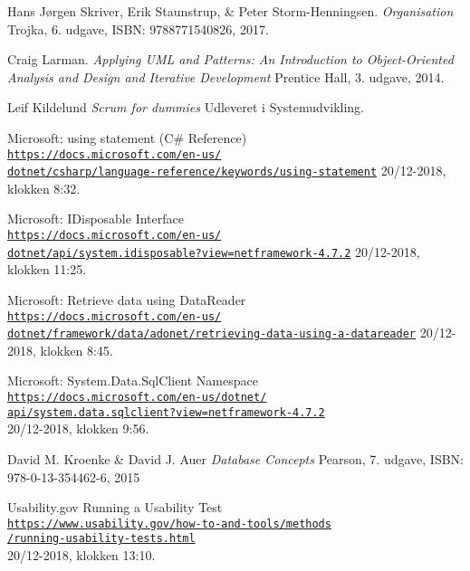 \begin{thebibliography}{9}

Hans Jørgen Skriver, Erik Staunstrup, \& Peter Storm-Henningsen.
\textit{Organisation}
Trojka, 6. udgave, ISBN: 9788771540826, 2017.

Craig Larman.
\textit{Applying UML and Patterns: An Introduction to Object-Oriented Analysis and Design and Iterative Development}
Prentice Hall, 3. udgave, 2014.

Leif Kildelund
\textit{Scrum for dummies}
Udleveret i Systemudvikling.

Microsoft: using statement (C\# Reference)
\\\href{https://docs.microsoft.com/en-us/dotnet/csharp/language-reference/keywords/using-statement}{\texttt{https://docs.microsoft.com/en-us/\\dotnet/csharp/language-reference/keywords/using-statement}}
20/12-2018, klokken 8:32.

Microsoft: IDisposable Interface
\\\href{https://docs.microsoft.com/en-us/dotnet/api/system.idisposable?view=netframework-4.7.2}{\texttt{https://docs.microsoft.com/en-us/\\dotnet/api/system.idisposable?view=netframework-4.7.2}}
20/12-2018, klokken 11:25.

Microsoft: Retrieve data using DataReader
\\\href{https://docs.microsoft.com/en-us/dotnet/framework/data/adonet/retrieving-data-using-a-datareader}{\texttt{https://docs.microsoft.com/en-us/\\dotnet/framework/data/adonet/retrieving-data-using-a-datareader}}
20/12-2018, klokken 8:45.

Microsoft: System.Data.SqlClient Namespace
\\\href{https://docs.microsoft.com/en-us/dotnet/api/system.data.sqlclient?view=netframework-4.7.2}{\texttt{https://docs.microsoft.com/en-us/dotnet/\\api/system.data.sqlclient?view=netframework-4.7.2}}
\\20/12-2018, klokken 9:56.

David M. Kroenke \& David J. Auer
\textit{Database Concepts}
Pearson, 7. udgave, ISBN: 978-0-13-354462-6, 2015

Usability.gov Running a Usability Test
\\\href{https://www.usability.gov/how-to-and-tools/methods/running-usability-tests.html}{\texttt{https://www.usability.gov/how-to-and-tools/methods\\/running-usability-tests.html}}
\\20/12-2018, klokken 13:10.


\end{thebibliography}
